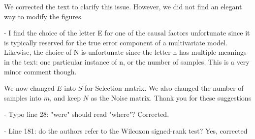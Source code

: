 We corrected the text to clarify this issue. However, we did not find an elegant way to
modify the figures.

- I find the choice of the letter E for one of the causal factors unfortunate
    since it is typically reserved for the true error component of a multivariate
    model. Likewise, the choice of N is unfortunate since the letter n has multiple
    meanings in the text: one particular instance of n, or the number of samples.
    This is a very minor comment though.

We now changed $E$ into $S$ for Selection matrix. We also changed the number of
samples into $m$, and keep $N$ as the Noise matrix. Thank you for these suggestions

- Typo line 28: "were" should read "where"?
Corrected.

- Line 181: do the authors refer to the Wilcoxon signed-rank test?
Yes, corrected